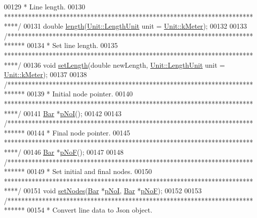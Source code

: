 \begin{DoxyCode}
00129 \textcolor{comment}{   * Line length.}
00130 \textcolor{comment}{   ****************************************************************************/}
00131   \textcolor{keywordtype}{double} \hyperlink{group___models_gae2e4500d0fa60dcc2ecb08b2c96954f9}{length}(\hyperlink{class_unit_a8c8921f7b225ad6063b1cb573425b9a0}{Unit::LengthUnit} unit = \hyperlink{class_unit_a8c8921f7b225ad6063b1cb573425b9a0abfa41ebe7ee649a1f02c9b8ae570434b}{Unit::kMeter});
00132 
00133   \textcolor{comment}{/*****************************************************************************}
00134 \textcolor{comment}{  * Set line length.}
00135 \textcolor{comment}{  ****************************************************************************/}
00136   \textcolor{keywordtype}{void} \hyperlink{group___models_ga950d0b8f5d167eda430c65ca7adadbb0}{setLength}(\textcolor{keywordtype}{double} newLength, \hyperlink{class_unit_a8c8921f7b225ad6063b1cb573425b9a0}{Unit::LengthUnit} unit = 
      \hyperlink{class_unit_a8c8921f7b225ad6063b1cb573425b9a0abfa41ebe7ee649a1f02c9b8ae570434b}{Unit::kMeter});
00137 
00138   \textcolor{comment}{/*****************************************************************************}
00139 \textcolor{comment}{   * Initial node pointer.}
00140 \textcolor{comment}{   ****************************************************************************/}
00141   \hyperlink{class_bar}{Bar} *\hyperlink{group___models_gaeafd90e84ac2f8de2a879abe9e53eef3}{pNoI}();
00142 
00143   \textcolor{comment}{/*****************************************************************************}
00144 \textcolor{comment}{   * Final node pointer.}
00145 \textcolor{comment}{   ****************************************************************************/}
00146   \hyperlink{class_bar}{Bar} *\hyperlink{group___models_gabbc73ddedd3075c33ae5331bd7c9829f}{pNoF}();
00147 
00148   \textcolor{comment}{/*****************************************************************************}
00149 \textcolor{comment}{   * Set initial and final nodes.}
00150 \textcolor{comment}{   ****************************************************************************/}
00151   \textcolor{keywordtype}{void} \hyperlink{group___models_gaeeab146e6c1d7d1a688a2764a9c9a170}{setNodes}(\hyperlink{class_bar}{Bar} *\hyperlink{group___models_gaeafd90e84ac2f8de2a879abe9e53eef3}{pNoI}, \hyperlink{class_bar}{Bar} *\hyperlink{group___models_gabbc73ddedd3075c33ae5331bd7c9829f}{pNoF});
00152 
00153   \textcolor{comment}{/*****************************************************************************}
00154 \textcolor{comment}{   * Convert line data to Json object.}

\end{DoxyCode}
